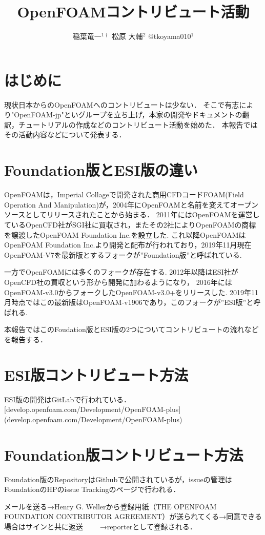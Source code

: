 \documentclass{ltjoc}
\title{OpenFOAMコントリビュート活動}
\author{%
稲葉竜一$^{1\dagger}$%
\hspace{1\zw}%
松原 大輔$^{2}$%
\hspace{1\zw}%
@tkoyama010$^{1}$%
}
\affiliation{%
${}^{1}$OpenFOAM-jp%
\hspace{1\zw}%
${}^{2}$オープン CAE勉強会%
}
\begin{document}
\maketitle
\section{はじめに}
現状日本からのOpenFOAMへのコントリビュートは少ない．
そこで有志により"OpenFOAM-jp"といグループを立ち上げ，本家の開発やドキュメントの翻訳，チュートリアルの作成などのコントリビュート活動を始めた．
本報告ではその活動内容などについて発表する．
\section{Foundation版とESI版の違い}
OpenFOAMは，Imperial Collageで開発された商用CFDコードFOAM(Field Operation And Manipulation)が，2004年にOpenFOAMと名前を変えてオープンソースとしてリリースされたことから始まる．\cite{URL:openfoam.history}\cite{Minabe:OpenCAE2015-GP23}
2011年にはOpenFOAMを運営しているOpenCFD社がSGI社に買収され，またその2社によりOpenFOAMの商標を譲渡したOpenFOAM Foundation Inc.を設立した.
これ以降OpenFOAMはOpenFOAM Foundation Inc.より開発と配布が行われており，2019年11月現在OpenFOAM-V7を最新版とするフォークが”Foundation版”\cite{URL:openfoam.org}\cite{URL:GitHub-foundation}と呼ばれている.

一方でOpenFOAMには多くのフォークが存在する.
2012年以降はESI社がOpenCFD社の買収という形から開発に加わるようになり，
2016年にはOpenFOAM-v3.0からフォークしたOpenFOAM-v3.0+をリリースした.
2019年11月時点ではこの最新版はOpenFOAM-v1906であり，このフォークが”ESI版”\cite{URL:openfoam.com}\cite{URL:GitLab-plus}と呼ばれる.

本報告ではこのFoudation版とESI版の2つについてコントリビュートの流れなどを報告する．
\section{ESI版コントリビュート方法}
ESI版の開発はGitLabで行われている．[develop.openfoam.com/Development/OpenFOAM-plus](develop.openfoam.com/Development/OpenFOAM-plus)
\section{Foundation版コントリビュート方法}
Foundation版のRepositoryはGithubで公開されているが，issueの管理はFoundationのHPのissue Trackingのページで行われる．

メールを送る→Henry G. Wellerから登録用紙（THE OPENFOAM FOUNDATION CONTRIBUTOR AGREEMENT）が送られてくる→同意できる場合はサインと共に返送　
　→reporterとして登録される．
\end{document}
